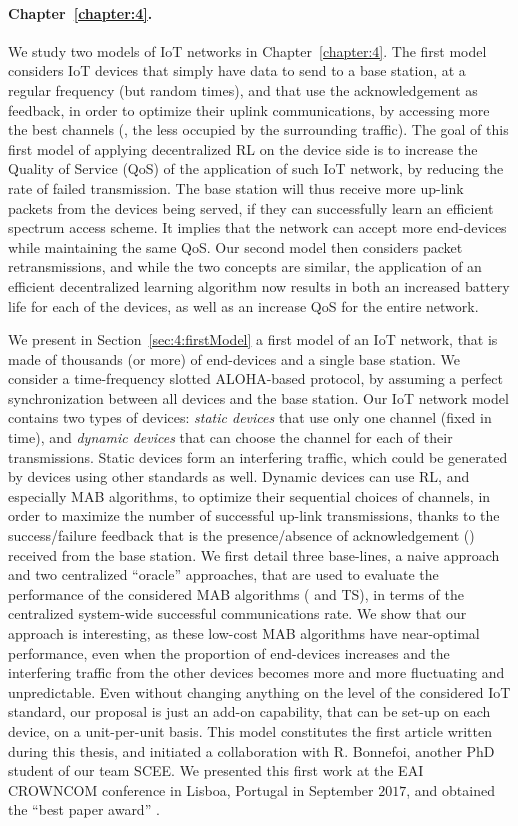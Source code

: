 \paragraph{Chapter~\ref{chapter:4}.}
%
We study two models of IoT networks in Chapter~\ref{chapter:4}.
The first model considers IoT devices that simply have data to send to a base station, at a regular frequency (but random times), and that use the acknowledgement as feedback, in order to optimize their uplink communications, by accessing more the best channels (\ie, the less occupied by the surrounding traffic).
The goal of this first model of applying decentralized RL on the device side is to increase the Quality of Service (QoS) of the application of such IoT network, by reducing the rate of failed transmission.
The base station will thus receive more up-link packets from the devices being served, if they can successfully learn an efficient spectrum access scheme.
It implies that the network can accept more end-devices while maintaining the same QoS.
%
Our second model then considers packet retransmissions, and while the two concepts are similar, the application of an efficient decentralized learning algorithm now results in both an increased battery life for each of the devices, as well as an increase QoS for the entire network.

We present in Section~\ref{sec:4:firstModel} a first model of an IoT network, that is made of thousands (or more) of end-devices and a single base station.
We consider a time-frequency slotted ALOHA-based protocol, by assuming a perfect synchronization between all devices and the base station.
%
Our IoT network model contains two types of devices: \emph{static devices} that use only one channel (fixed in time), and \emph{dynamic devices} that can choose the channel for each of their transmissions.
Static devices form an interfering traffic, which could be generated by devices using other standards as well.
Dynamic devices can use RL, and especially MAB algorithms, to optimize their sequential choices of channels, in order to maximize the number of successful up-link transmissions, thanks to the success/failure feedback that is the presence/absence of acknowledgement (\Ack) received from the base station.
%
We first detail three base-lines, a naive approach and two centralized ``oracle'' approaches,
that are used to evaluate the performance of the considered MAB algorithms (\UCB{} and TS), in terms of the centralized system-wide successful communications rate.
We show that our approach is interesting, as these low-cost MAB algorithms have near-optimal performance, even when the proportion of end-devices increases and the interfering traffic from the other devices becomes more and more fluctuating and unpredictable.
%
Even without changing anything on the level of the considered IoT standard, our proposal is just an add-on capability, that can be set-up on each device, on a unit-per-unit basis.
This model constitutes the first article written during this thesis, and initiated a collaboration with R. Bonnefoi, another PhD student of our team SCEE.
We presented this first work at the EAI CROWNCOM conference in Lisboa, Portugal in September $2017$, and obtained the ``best paper award'' \cite{Bonnefoi17}.

